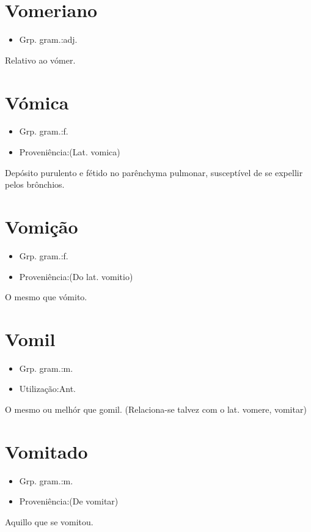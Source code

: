 \documentclass{article}
\begin{document}
\section{Vomeriano}
\begin{itemize}
\item {Grp. gram.:adj.}
\end{itemize}
Relativo ao vómer.
\section{Vómica}
\begin{itemize}
\item {Grp. gram.:f.}
\end{itemize}
\begin{itemize}
\item {Proveniência:(Lat. \textunderscore vomica\textunderscore )}
\end{itemize}
Depósito purulento e fétido no parênchyma pulmonar, susceptível de se expellir pelos brônchios.
\section{Vomição}
\begin{itemize}
\item {Grp. gram.:f.}
\end{itemize}
\begin{itemize}
\item {Proveniência:(Do lat. \textunderscore vomitio\textunderscore )}
\end{itemize}
O mesmo que \textunderscore vómito\textunderscore .
\section{Vomil}
\begin{itemize}
\item {Grp. gram.:m.}
\end{itemize}
\begin{itemize}
\item {Utilização:Ant.}
\end{itemize}
O mesmo ou melhór que \textunderscore gomil\textunderscore .
(Relaciona-se talvez com o lat. \textunderscore vomere\textunderscore , vomitar)
\section{Vomitado}
\begin{itemize}
\item {Grp. gram.:m.}
\end{itemize}
\begin{itemize}
\item {Proveniência:(De \textunderscore vomitar\textunderscore )}
\end{itemize}
Aquillo que se vomitou.
\end{document}
